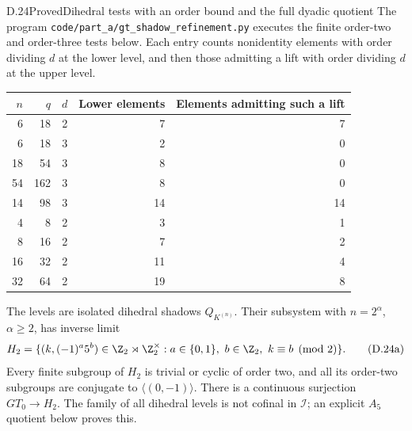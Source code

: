\begin{claim}{D.24}{Proved}{Dihedral tests with an order bound and the full dyadic quotient}
The program \texttt{code/part\_a/gt\_shadow\_refinement.py} executes
the finite order-two and order-three tests below. Each entry counts
nonidentity elements with order dividing $d$ at the lower level,
and then those admitting a lift with order dividing $d$ at the
upper level.
\begin{center}
\begin{tabular}{rrrrr}
\toprule
$n$&$q$&$d$&Lower elements&Elements admitting such a lift\\
\midrule
6&18&2&7&7\\
6&18&3&2&0\\
18&54&3&8&0\\
54&162&3&8&0\\
14&98&3&14&14\\
4&8&2&3&1\\
8&16&2&7&2\\
16&32&2&11&4\\
32&64&2&19&8\\
\bottomrule
\end{tabular}
\end{center}
The levels are isolated dihedral shadows $Q_{K^{(n)}}$. Their
subsystem with $n=2^\alpha$, $\alpha\geq2$, has inverse limit
\[
 H_2=\{(k,(-1)^a5^b)\in
 \Z_2\rtimes\Z_2^\times:
 a\in\{0,1\},\ b\in\Z_2,\ k\equiv b\pmod2\}.
                                                               \tag{D.24a}
\]
Every finite subgroup of $H_2$ is trivial or cyclic of order two,
and all its order-two subgroups are conjugate to
$\langle(0,-1)\rangle$. There is a continuous surjection
$GT_0\to H_2$. The family of all dihedral levels is not cofinal
in $\mathcal I$; an explicit $A_5$ quotient below proves this.
\end{claim}
